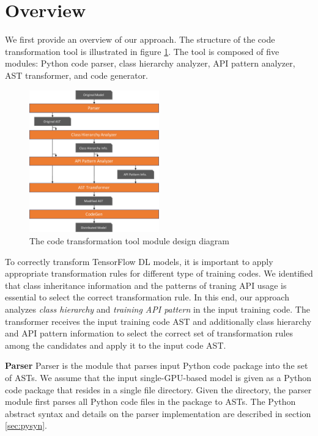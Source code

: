 \section{Overview}

We first provide an overview of our approach.
The structure of the code transformation tool is 
illustrated in figure \ref{sysarch}.
The tool is composed of five modules: Python code parser,
class hierarchy analyzer, API pattern analyzer, AST transformer,
and code generator.

\begin{figure}[ht!]
  \centering
  \includegraphics[width=0.5\textwidth]{tool-arch.pdf}
  \caption{The code transformation tool module design diagram}
  \label{sysarch}
\end{figure}
  
To correctly transform TensorFlow DL models,
it is important to apply appropriate transformation rules
for different type of training codes.
We identified that class inheritance information and
the patterns of traning API usage is essential to 
select the correct transformation rule. 
In this end, our approach analyzes \textit{class hierarchy}
and \textit{training API pattern} in the input training code.
The transformer receives the input training code AST and
additionally class hierarchy and API pattern information
to select the correct set of transformation rules among the candidates
and apply it to the input code AST.

\textbf{Parser}
Parser is the module that parses input Python code package
into the set of ASTs.
We assume that the input single-GPU-based model is given as a Python code
package that resides in a single file directory.
Given the directory, the parser module first parses all Python code files
in the package to ASTs.
The Python abstract syntax and details on the parser implementation
are described in section \ref{sec:pysyn}.

